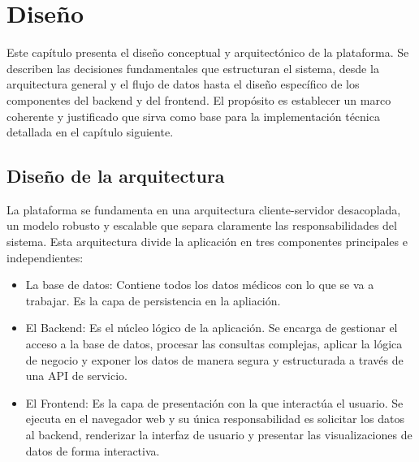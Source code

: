 \chapter{Diseño}

Este capítulo presenta el diseño conceptual y arquitectónico de la plataforma. Se describen las decisiones fundamentales que estructuran el sistema, desde la arquitectura general y el flujo de datos hasta el diseño específico de los componentes del backend y del frontend. El propósito es establecer un marco coherente y justificado que sirva como base para la implementación técnica detallada en el capítulo siguiente.

\section{Diseño de la arquitectura}

La plataforma se fundamenta en una arquitectura cliente-servidor desacoplada, un modelo robusto y escalable que separa claramente las responsabilidades del sistema. Esta arquitectura divide la aplicación en tres componentes principales e independientes:

\begin{itemize}
    
    \item La base de datos: Contiene todos los datos médicos con lo que se va a trabajar. Es la capa de persistencia en la apliación.
    
    \item El Backend: Es el núcleo lógico de la aplicación. Se encarga de gestionar el acceso a la base de datos, procesar las consultas complejas, aplicar la lógica de negocio y exponer los datos de manera segura y estructurada a través de una API de servicio.

    \item El Frontend: Es la capa de presentación con la que interactúa el usuario. Se ejecuta en el navegador web y su única responsabilidad es solicitar los datos al backend, renderizar la interfaz de usuario y presentar las visualizaciones de datos de forma interactiva.
\end{itemize}



